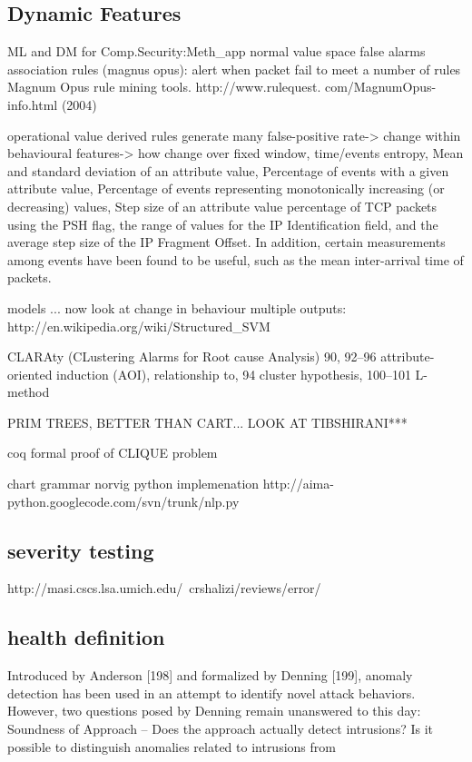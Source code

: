 \documentclass[12pt]{article}
\begin{document}
\subsection*{Dynamic Features}
ML and DM for Comp.Security:Meth_app
normal value space false alarms
association rules (magnus opus): alert when packet fail to meet a number of rules
Magnum Opus rule mining tools. http://www.rulequest.
com/MagnumOpus-info.html (2004)

operational value derived rules generate many false-positive rate-> change within
behavioural features-> how change over fixed window, time/events
entropy, Mean and standard deviation of an attribute value, Percentage of events with a given attribute value, Percentage of events representing monotonically increasing (or decreasing) values, Step size of an attribute value
percentage of TCP packets using the PSH flag, the range of values for the IP
Identification field, and the average step size of the IP Fragment Offset. In
addition, certain measurements among events have been found to be useful,
such as the mean inter-arrival time of packets.

models ... now look at change in behaviour
multiple outputs:
http://en.wikipedia.org/wiki/Structured_SVM


CLARAty (CLustering Alarms for Root
cause Analysis) 90, 92–96
attribute-oriented induction (AOI),
relationship to, 94
cluster hypothesis, 100–101
L-method

PRIM TREES, BETTER THAN CART... LOOK AT TIBSHIRANI***

coq formal proof of CLIQUE problem

chart grammar norvig python implemenation
http://aima-python.googlecode.com/svn/trunk/nlp.py

\subsection*{severity testing}
http://masi.cscs.lsa.umich.edu/~crshalizi/reviews/error/


\subsection*{health definition}
Introduced by Anderson [198] and formalized by Denning [199], anomaly detection
has been used in an attempt to identify novel attack behaviors. However,
two questions posed by Denning remain unanswered to this day:
Soundness of Approach – Does the approach actually detect intrusions?
Is it possible to distinguish anomalies related to intrusions from
\end{document}
